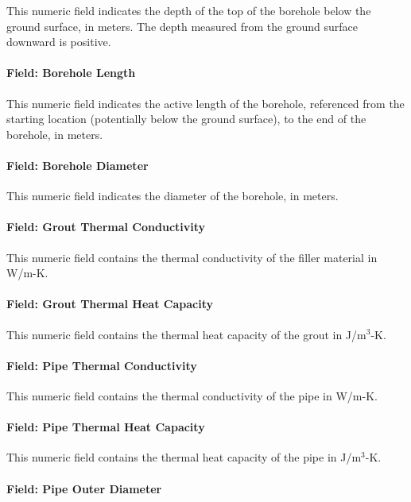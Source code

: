 This numeric field indicates the depth of the top of the borehole below the ground surface, in meters. The depth measured from the ground surface downward is positive.

\paragraph{Field: Borehole Length}

This numeric field indicates the active length of the borehole, referenced from the starting location (potentially below the ground surface), to the end of the borehole, in meters.

\paragraph{Field: Borehole Diameter}

This numeric field indicates the diameter of the borehole, in meters.

\paragraph{Field: Grout Thermal Conductivity}\label{field-grout-thermal-conductivity}

This numeric field contains the thermal conductivity of the filler material in W/m-K.

\paragraph{Field: Grout Thermal Heat Capacity}

This numeric field contains the thermal heat capacity of the grout in J/m\(^{3}\)-K.

\paragraph{Field: Pipe Thermal Conductivity}\label{field-pipe-thermal-conductivity-000}

This numeric field contains the thermal conductivity of the pipe in W/m-K.

\paragraph{Field: Pipe Thermal Heat Capacity}

This numeric field contains the thermal heat capacity of the pipe in J/m\(^{3}\)-K.

\paragraph{Field: Pipe Outer Diameter}\label{field-pipe-out-diameter}

